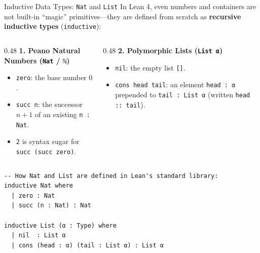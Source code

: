 \documentclass[aspectratio=169, 10pt]{beamer}
\begin{document}
\begin{frame}[fragile]{Inductive Data Types: \texttt{Nat} and \texttt{List}}
  In Lean 4, even numbers and containers are not built-in ``magic'' primitives---they are defined from scratch as \textbf{recursive inductive types} (\texttt{inductive}):

  \vspace{0.1cm}
  \begin{columns}[T]
    \begin{column}{0.48\textwidth}
      \textbf{1. Peano Natural Numbers (\texttt{Nat} / \texttt{ℕ})}
      \begin{itemize}
        \item \texttt{zero}: the base number $0$.
        \item \texttt{succ n}: the successor $n + 1$ of an existing \texttt{n : Nat}.
        \item \texttt{2} is syntax sugar for \texttt{succ (succ zero)}.
      \end{itemize}
    \end{column}

    \begin{column}{0.48\textwidth}
      \textbf{2. Polymorphic Lists (\texttt{List α})}
      \begin{itemize}
        \item \texttt{nil}: the empty list \texttt{[]}.
        \item \texttt{cons head tail}: an element \texttt{head : α} prepended to \texttt{tail : List α} (written \texttt{head :: tail}).
      \end{itemize}
    \end{column}
  \end{columns}

  \vspace{0.1cm}
\begin{lstlisting}[language=Lean4]
-- How Nat and List are defined in Lean's standard library:
inductive Nat where
  | zero : Nat
  | succ (n : Nat) : Nat

inductive List (α : Type) where
  | nil  : List α
  | cons (head : α) (tail : List α) : List α
\end{lstlisting}
\end{frame}
\end{document}
